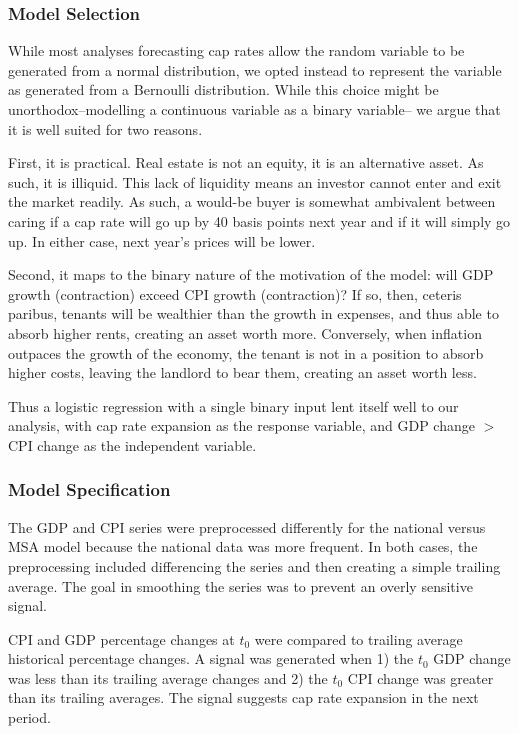 \documentclass[jrfm,article,submit,oneauthor,pdftex]{Definitions/mdpi}
\begin{document}
\subsubsection{Model Selection}
While most analyses forecasting cap rates allow the random variable to be generated from a normal distribution, we opted instead to represent the variable as generated from a Bernoulli distribution. While this choice might be unorthodox--modelling a continuous variable as a binary variable-- we argue that it is well suited for two reasons. 

First, it is practical. Real estate is not an equity, it is an alternative asset. As such, it is illiquid. This lack of liquidity means an investor cannot enter and exit the market readily. As such, a would-be buyer is somewhat ambivalent between caring if a cap rate will go up by 40 basis points next year and if it  will simply go up. In either case, next year's prices will be lower. 

Second, it maps to the binary nature of the motivation of the model: will GDP growth (contraction) exceed CPI growth (contraction)? If so, then, ceteris paribus, tenants will be wealthier than the growth in expenses, and thus able to absorb higher rents, creating an asset worth more. Conversely, when inflation outpaces the growth of the economy, the tenant is not in a position to absorb higher costs, leaving the landlord to bear them, creating an asset worth less. 

Thus a logistic regression with a single binary input lent itself well to our analysis, with cap rate expansion as the response variable, and GDP change $ > $  CPI change as the independent variable. 

\subsubsection{Model Specification}

The GDP and CPI series were preprocessed differently for the national versus MSA model because the national data was more frequent. In both cases, the preprocessing included differencing the series and then creating a simple trailing average. The goal in smoothing the series was to prevent an overly sensitive signal. 

CPI and GDP percentage changes at $t_0$ were compared to trailing average historical percentage changes. A  signal was generated when 1) the $t_0$ GDP change was less than its trailing average changes and 2) the $t_0$ CPI change was greater than its trailing averages. The signal suggests cap rate expansion in the next period. 
\end{document}
